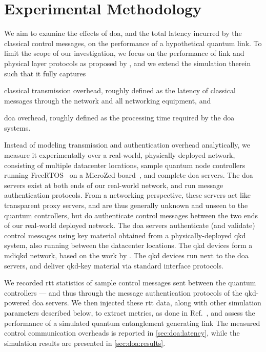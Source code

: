 \section{Experimental Methodology}
\label{sec:doa:meth}

We aim to examine the effects of \acrlong{doa}, and the total latency incurred by the classical
control messages, on the performance of a hypothetical quantum link. To limit the scope of our
investigation, we focus on the performance of link and physical layer protocols as proposed by
\textcite{dahlberg_2019_egp}, and we extend the simulation therein such that it fully captures
%
\begin{inlinelist}
    \item classical transmission overhead, roughly defined as the latency of classical messages
          through the network and all networking equipment, and
    \item \acrshort{doa} overhead, roughly defined as the processing time required by the
          \acrshort{doa} systems.
\end{inlinelist}

Instead of modeling transmission and authentication overhead analytically, we measure it
experimentally over a real-world, physically deployed network, consisting of multiple datacenter
locations, sample quantum node controllers running FreeRTOS~\cite{freertos} on a MicroZed
board~\cite{microzed}, and complete \acrshort{doa} servers. The \acrshort{doa} servers exist at both
ends of our real-world network, and run message authentication protocols. From a networking
perspective, these servers act like transparent proxy servers, and are thus generally unknown and
unseen to the quantum controllers, but do authenticate control messages between the two ends of our
real-world deployed network. The \acrshort{doa} servers authenticate (and validate) control messages
using key material obtained from a physically-deployed \acrshort{qkd} system, also running between
the datacenter locations. The \acrshort{qkd} devices form a \acrfull{mdiqkd} network, based on the
work by \textcite{berrevoets_2022_deployed}. The \acrshort{qkd} devices run next to the
\acrshort{doa} servers, and deliver \acrshort{qkd}-key material via standard interface protocols.

We recorded \acrfull{rtt} statistics of sample control messages sent between the quantum controllers
--- and thus through the message authentication protocols of the \acrshort{qkd}-powered
\acrshort{doa} servers. We then injected these \acrshort{rtt} data, along with other simulation
parameters described below, to extract metrics, as done in Ref.~\cite{dahlberg_2019_egp}, and assess
the performance of a simulated quantum entanglement generating link The measured control
communication overheads is reported in \cref{sec:doa:latency}, while the simulation results are
presented in \cref{sec:doa:results}.

